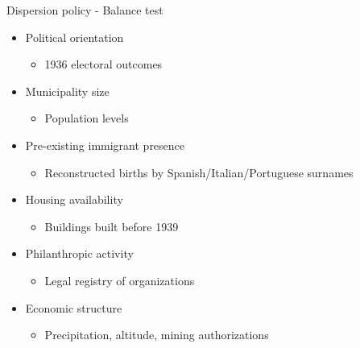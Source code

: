 \documentclass[xcolor=dvipsnames, aspectratio=169]{beamer}
\begin{document}
\begin{frame}[label=dispersion]{Dispersion policy - Balance test}

\begin{itemize}
  \item Political orientation
    \begin{itemize}
      \item 1936 electoral outcomes \citep{piketty_histoire_2023}
    \end{itemize}
  \item Municipality size
    \begin{itemize}
      \item Population levels \citep{insee_pop_hist_comm}
    \end{itemize}
  \item Pre-existing immigrant presence
    \begin{itemize}
      \item Reconstructed births by Spanish/Italian/Portuguese surnames \citep{insee_deces_2025}
    \end{itemize}
  \item Housing availability
    \begin{itemize}
      \item Buildings built before 1939 \citep{insee1968logements}
    \end{itemize}
  \item Philanthropic activity
    \begin{itemize}
      \item Legal registry of organizations \citep{dila_journalofficiel_portal}
    \end{itemize}
  \item Economic structure
    \begin{itemize}
      \item Precipitation, altitude, mining authorizations \citep{pauling2006,camino2021}
    \end{itemize}
\end{itemize}

\hyperlink{Balance}{} 

\end{frame}
\end{document}
